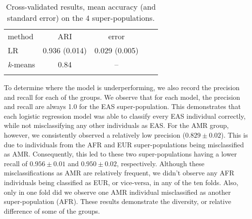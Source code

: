 \documentclass{llncs}
\newcommand{\kMeans}{\textit{k}-means}
\begin{document}
{\begin{table}
\caption{Cross-validated results, mean accuracy (and standard error) on the 4 super-populations.}
\begin{center}
\renewcommand{\arraystretch}{1.4}
\setlength\tabcolsep{3pt}
\begin{tabular}{lcccc}
\hline\noalign{\smallskip}
method  & ARI & error \\
LR  & 0.936 (0.014) & 0.029 (0.005) \\
\kMeans & 0.84 & -- \\
\noalign{\smallskip}
\hline
\end{tabular}
\end{center}
\end{table}

To determine where the model is underperforming, we also record the precision and recall for each of the groups.
We observe that for each model, the precision and recall are always 1.0 for the EAS super-population.
This demonstrates that each logistic regression model was able to classify every EAS individual correctly, while not misclassifying any other individuals as EAS.
For the AMR group, however, we consistently observed a relatively low precision (\(0.829 \pm{} 0.02 \)).
This is due to individuals from the AFR and EUR super-populations being misclassified as AMR.
Consequently, this led to these two super-populations having a lower recall of \(0.956 \pm 0.01 \) and \(0.950 \pm 0.02 \), respectively.
Although these misclassifications as AMR are relatively frequent, we didn't observe any AFR individuals being classified as EUR, or vice-versa, in any of the ten folds.
Also, only in one fold did we observe one AMR individual misclassified as another super-population (AFR).
These results demonstrate the diversity, or relative difference of some of the groups. 

 

}
\end{document}
